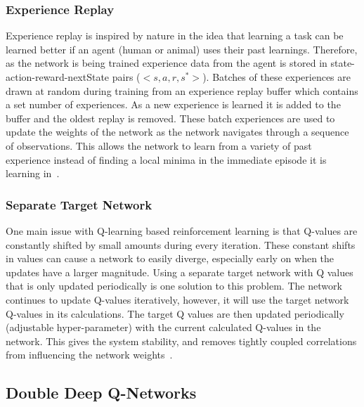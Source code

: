 \documentclass[12pt,american]{report}
\begin{document}
\subsubsection{Experience Replay}

Experience replay is inspired by nature in the idea that learning a task can be learned better if an agent (human or animal) uses their past learnings.  Therefore, as the network is being trained experience data from the agent is stored in state-action-reward-nextState pairs ($<s,a,r,s^{*}>$). Batches of these experiences are drawn at random during training from an experience replay buffer which contains a set number of experiences.  As a new experience is learned it is added to the buffer and the oldest replay is removed. These batch experiences are used to update the weights of the network as the network navigates through a sequence of observations.  This allows the network to learn from a variety of past experience instead of finding a local minima in the immediate episode it is learning in~\cite{atari}.

\subsubsection{Separate Target Network}

One main issue with Q-learning based reinforcement learning is that Q-values are constantly shifted by small amounts during every iteration.  These constant shifts in values can cause a network to easily diverge, especially early on when the updates have a larger magnitude.  Using a separate target network with Q values that is only updated periodically is one solution to this problem.  The network continues to update Q-values iteratively, however, it will use the target network Q-values in its calculations.  The target Q values are then updated periodically (adjustable hyper-parameter) with the current calculated Q-values in the network.  This gives the system stability, and removes tightly coupled correlations from influencing the network weights~\cite{atari}.


\subsection{Double Deep Q-Networks}
\end{document}
